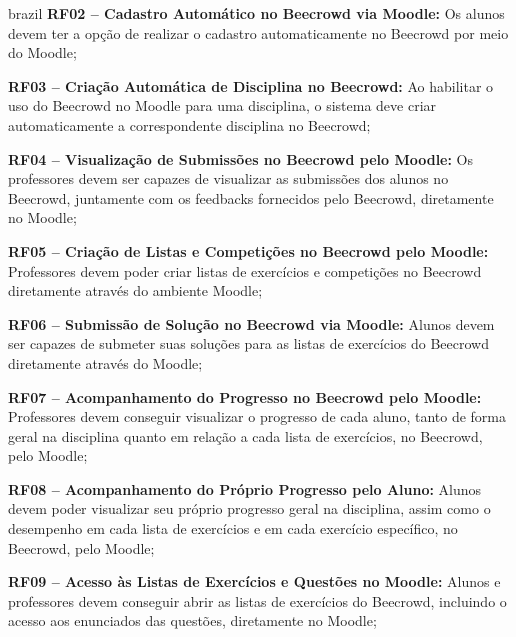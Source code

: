 \begin{otherlanguage*}{brazil}
\textbf{RF02 – Cadastro Automático no Beecrowd via Moodle:} Os alunos devem ter a opção de realizar o cadastro automaticamente no Beecrowd por meio do Moodle;

\vspace{12pt}

\textbf{RF03 – Criação Automática de Disciplina no Beecrowd:} Ao habilitar o uso do Beecrowd no Moodle para uma disciplina, o sistema deve criar automaticamente a correspondente disciplina no Beecrowd;

\vspace{12pt}

\textbf{RF04 – Visualização de Submissões no Beecrowd pelo Moodle:} Os professores devem ser capazes de visualizar as submissões dos alunos no Beecrowd, juntamente com os feedbacks fornecidos pelo Beecrowd, diretamente no Moodle;

\vspace{12pt}

\textbf{RF05 – Criação de Listas e Competições no Beecrowd pelo Moodle:} Professores devem poder criar listas de exercícios e competições no Beecrowd diretamente através do ambiente Moodle;

\vspace{12pt}

\textbf{RF06 – Submissão de Solução no Beecrowd via Moodle:} Alunos devem ser capazes de submeter suas soluções para as listas de exercícios do Beecrowd diretamente através do Moodle;

\vspace{12pt}

\textbf{RF07 – Acompanhamento do Progresso no Beecrowd pelo Moodle:} Professores devem conseguir visualizar o progresso de cada aluno, tanto de forma geral na disciplina quanto em relação a cada lista de exercícios, no Beecrowd, pelo Moodle;

\vspace{12pt}

\textbf{RF08 – Acompanhamento do Próprio Progresso pelo Aluno:} Alunos devem poder visualizar seu próprio progresso geral na disciplina, assim como o desempenho em cada lista de exercícios e em cada exercício específico, no Beecrowd, pelo Moodle;

\vspace{12pt}

\textbf{RF09 – Acesso às Listas de Exercícios e Questões no Moodle:} Alunos e professores devem conseguir abrir as listas de exercícios do Beecrowd, incluindo o acesso aos enunciados das questões, diretamente no Moodle;


\end{otherlanguage*}
